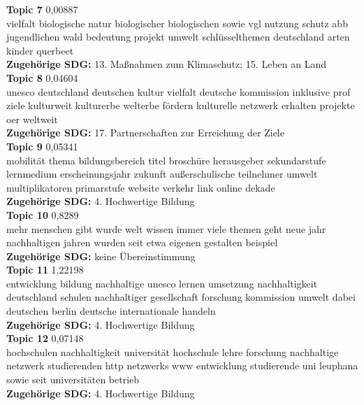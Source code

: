 \documentclass[letterpaper]{article}
\begin{document}
 
\textbf{Topic 7} 0,00887 \\
vielfalt biologische natur biologischer biologischen sowie vgl nutzung schutz abb jugendlichen wald bedeutung projekt umwelt schlüsselthemen deutschland arten kinder querbeet    \\
\textbf{Zugehörige SDG:} 13. Maßnahmen zum Klimaschutz; 15. Leben an Land \\

\textbf{Topic 8} 0,04604 \\
unesco deutschland deutschen kultur vielfalt deutsche kommission inklusive prof ziele kulturweit kulturerbe welterbe fördern kulturelle netzwerk erhalten projekte oer weltweit   \\
\textbf{Zugehörige SDG:} 17. Partnerschaften zur Erreichung der Ziele \\

\textbf{Topic 9} 0,05341  \\
mobilität thema bildungsbereich titel broschüre herausgeber sekundarstufe lernmedium erscheinungsjahr zukunft außerschulische teilnehmer umwelt multiplikatoren primarstufe website verkehr link online dekade    \\
\textbf{Zugehörige SDG:} 4. Hochwertige Bildung \\

\textbf{Topic 10} 0,8289 \\
mehr menschen gibt wurde welt wissen immer viele themen geht neue jahr nachhaltigen jahren wurden seit etwa eigenen gestalten beispiel   \\
\textbf{Zugehörige SDG:} keine Übereinstimmung \\

\textbf{Topic 11} 1,22198 \\
     entwicklung bildung nachhaltige unesco lernen umsetzung nachhaltigkeit deutschland schulen nachhaltiger gesellschaft forschung kommission umwelt dabei deutschen berlin deutsche internationale handeln   \\
   \textbf{Zugehörige SDG:} 4. Hochwertige Bildung \\
   
\textbf{Topic 12} 0,07148 \\
     hochschulen nachhaltigkeit universität hochschule lehre forschung nachhaltige netzwerk studierenden http netzwerks www entwicklung studierende uni leuphana sowie seit universitäten betrieb    \\
   \textbf{Zugehörige SDG:} 4. Hochwertige Bildung \\
   
\end{document}
